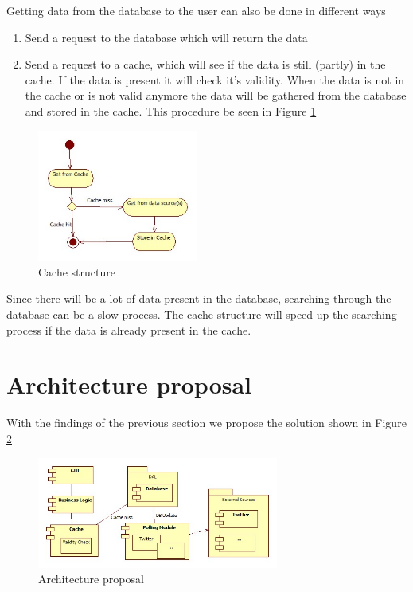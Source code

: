 \documentclass{article}
\begin{document}
Getting data from the database to the user can also be done in different ways
\begin{enumerate}
\item Send a request to the database which will return the data
\item Send a request to a cache, which will see if the data is still (partly) in the cache. If the data is present it will check it's validity. When the data is not in the cache or is not valid anymore the data will be gathered from the database and stored in the cache.  This procedure be seen in Figure \ref{fig:fig5}
\end{enumerate}

\begin{figure}[!]
\centering
\includegraphics[width=200px]{Cached}
\caption{Cache structure}
\label{fig:fig5}
\end{figure}

Since there will be a lot of data present in the database, searching through the database can be a slow process. The cache structure will speed up the searching process if the data is already present in the cache. 
\section*{Architecture proposal}

With the findings of the previous section we propose the solution shown in Figure \ref{fig:fig6}

\begin{figure}[!]
\centering
\includegraphics[width=300px]{ProposedSolution}
\caption{Architecture proposal}
\label{fig:fig6}
\end{figure}


\newpage

\nocite{*}


\end{document}
